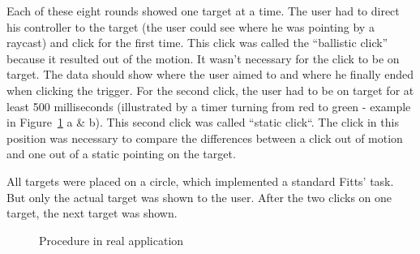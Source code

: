 Each of these eight rounds showed one target at a time. The user had to direct his controller to the target (the user could see where he was pointing by a raycast) and click for the first time. This click was called the ``ballistic click'' because it resulted out of the motion. It wasn't necessary for the click to be on target. The data should show where the user aimed to and where he finally ended when clicking the trigger. For the second click, the user had to be on target for at least 500 milliseconds (illustrated by a timer turning from red to green - example in Figure~\ref{fig:procedure-design} a \& b). This second click was called ``static click``. The click in this position was necessary to compare the differences between a click out of motion and one out of a static pointing on the target. 

All targets were placed on a circle, which implemented a standard Fitts' task. But only the actual target was shown to the user. After the two clicks on one target, the next target was shown.

\begin{figure}[h]
    \centering
    \qquad
    \qquad
    \caption{Procedure in real application}
    \label{fig:procedure-design}
\end{figure}

